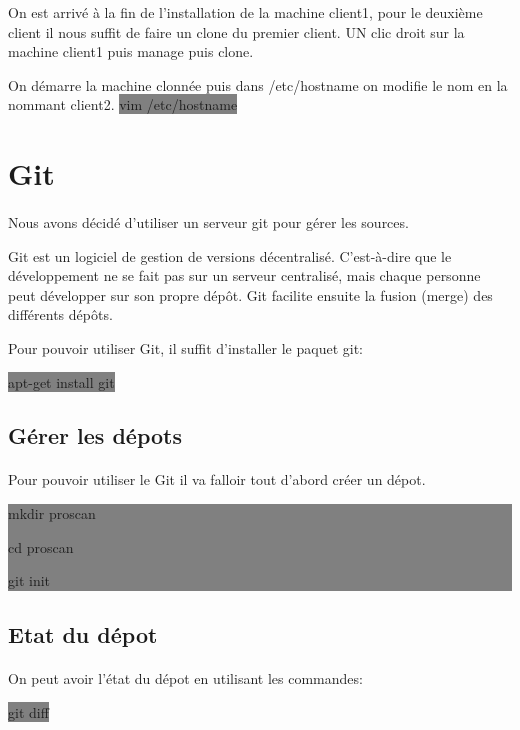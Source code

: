 \documentclass[11pt,a4paper,titlepage, oneside]{article}
\begin{document}
		On est arrivé à la fin de l'installation de la machine client1, pour le deuxième client il nous suffit de faire un clone du premier client. UN clic droit sur la machine client1 puis manage puis clone.

	On démarre la machine clonnée puis dans /etc/hostname on modifie le nom en la nommant client2.
		\colorbox{gray}{vim /etc/hostname}

	
\newpage
\section{{\color{red} Git}}
	\paragraph{}
		Nous avons décidé d'utiliser un serveur git pour gérer les sources.
		
		Git est un logiciel de gestion de versions décentralisé. C'est-à-dire que le développement ne se fait pas sur un serveur centralisé, mais chaque personne peut développer sur son propre dépôt. Git facilite ensuite la fusion (merge) des différents dépôts.

		Pour pouvoir utiliser Git, il suffit d'installer le paquet git:
	
		\colorbox{gray} {apt-get install git}

	\subsection{{\color{blue} Gérer les dépots}}
		\paragraph{}
			Pour pouvoir utiliser le Git il va falloir tout d'abord créer un dépot.
			
			\colorbox{gray}{mkdir proscan

				cd proscan
	
				git init}
	
	\subsection{{\color{blue} Etat du dépot}}	
		\paragraph{}
		On peut avoir l'état du dépot en utilisant les commandes:
		
			\colorbox{gray}{git diff}
			
\end{document}

